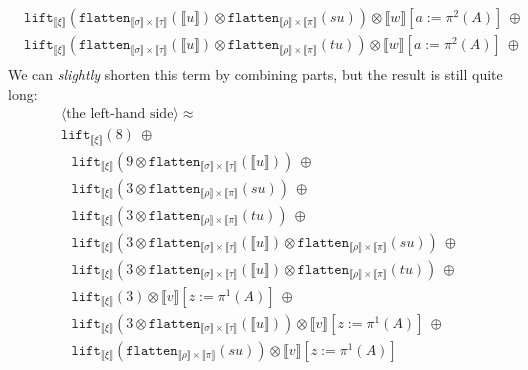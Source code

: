 \documentclass[runningheads,a4paper]{llncs}
\newcommand{\typeinterpret}[1]{\llbracket #1 \rrbracket}
\newcommand{\interpret}[1]{\llbracket #1 \rrbracket}
\newcommand{\flatten}{\mathtt{flatten}}
\newcommand{\lift}{\mathtt{lift}}
\begin{document}
\begin{itemize}
\[\begin{array}{l}
  \phantom{A}
    \lift_{\typeinterpret{\xi}}(\flatten_{\typeinterpret{\sigma} \times
    \typeinterpret{\tau}}(\interpret{u}) \otimes
    \flatten_{\typeinterpret{\rho} \times \typeinterpret{\pi}}(su))
    \otimes
    \interpret{w}[a:=\pi^2(A)]
    \ \oplus \\
  \phantom{A}
    \lift_{\typeinterpret{\xi}}(\flatten_{\typeinterpret{\sigma} \times
    \typeinterpret{\tau}}(\interpret{u}) \otimes
    \flatten_{\typeinterpret{\rho} \times \typeinterpret{\pi}}(tu))
    \otimes
    \interpret{w}[a:=\pi^2(A)]
    \ \oplus \\
  \end{array}
  \]
  We can \emph{slightly} shorten this term by combining parts, but
  the result is still quite long:
  \[
  \begin{array}{l}
  \langle\text{the left-hand side}\rangle \approx \\
  \lift_{\typeinterpret{\xi}}(8)\ \oplus \\
  \phantom{A}
     \lift_{\typeinterpret{\xi}}(9 \otimes
      \flatten_{\typeinterpret{\sigma} \times \typeinterpret{\tau}}(
      \interpret{u}))\ \oplus \\
  \phantom{A}
    \lift_{\typeinterpret{\xi}}(3 \otimes \flatten_{\typeinterpret{\rho}
    \times \typeinterpret{\pi}}(su))\ \oplus \\
  \phantom{A}
    \lift_{\typeinterpret{\xi}}(3 \otimes \flatten_{\typeinterpret{\rho}
    \times \typeinterpret{\pi}}(tu))\ \oplus \\
  \phantom{A}
    \lift_{\typeinterpret{\xi}}(3 \otimes \flatten_{\typeinterpret{\sigma}
    \times \typeinterpret{\tau}}(\interpret{u}) \otimes
    \flatten_{\typeinterpret{\rho} \times \typeinterpret{\pi}}(su))\ 
    \oplus \\
  \phantom{A}
    \lift_{\typeinterpret{\xi}}(3 \otimes \flatten_{\typeinterpret{\sigma}
    \times \typeinterpret{\tau}}(\interpret{u}) \otimes
    \flatten_{\typeinterpret{\rho} \times \typeinterpret{\pi}}(tu))\ 
    \oplus \\
  \phantom{A}
    \lift_{\typeinterpret{\xi}}(3) \otimes \interpret{v}[z:=\pi^1(A)]
    \ \oplus \\
  \phantom{A}
    \lift_{\typeinterpret{\xi}}(3 \otimes
    \flatten_{\typeinterpret{\sigma} \times \typeinterpret{\tau}}(
    \interpret{u})) \otimes
     \interpret{v}[z:=\pi^1(A)]
    \ \oplus \\
  \phantom{A}
    \lift_{\typeinterpret{\xi}}(\flatten_{\typeinterpret{\rho} \times
    \typeinterpret{\pi}}(su)) \otimes
     \interpret{v}[z:=\pi^1(A)]

\end{array}\]
\end{itemize}
\end{document}
